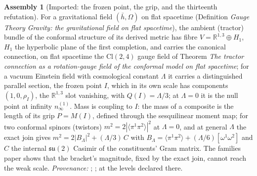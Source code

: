 \documentclass[11pt]{article}
\theoremstyle{definition}
\newtheorem{assembled}[theorem]{Assembly}
\theoremstyle{plain}
\newcommand{\changedmark}[2]{\marginpar{\raggedright\scriptsize\color{#1}#2}}
\providecommand{\Cl}{}\renewcommand{\Cl}{\mathrm{Cl}}
\providecommand{\R}{}\renewcommand{\R}{\mathbb{R}}
\providecommand{\hb}{}\renewcommand{\hb}{\bar{h}}
\providecommand{\nInf}{}\renewcommand{\nInf}{n_\infty}
\providecommand{\br}{}\renewcommand{\br}[1]{\langle #1\rangle}
\begin{document}
\begin{assembled}[Imported: the frozen point, the grip, and the thirteenth refutation]\label{c:standard-model.imported-frozen-point-grip-thirteenth-refutation}
\changedmark{gray}{reworded}
For a gravitational field $(\hb, \Omega)$ on flat spacetime (Definition \emph{Gauge Theory Gravity: the gravitational field on flat spacetime}), the ambient (tractor) bundle of the conformal structure of its derived metric has fibre $V = \R^{1,3} \oplus H_{1}$, $H_{1}$ the hyperbolic plane of the first completion, and carries the canonical connection, on flat spacetime the $\Cl(2,4)$ gauge field of Theorem \emph{The tractor connection as a rotation-gauge field of the conformal model on flat spacetime}; for a vacuum Einstein field with cosmological constant $\Lambda$ it carries a distinguished parallel section, the frozen point $I$, which in its own scale has components $(1, 0, \rho_{I})$, the $\R^{1,3}$ slot vanishing, with $Q(I) = \Lambda/3$; at $\Lambda = 0$ it is the null point at infinity $\nInf^{(1)}$. Mass is coupling to $I$: the mass of a composite is the length of its grip $P = M(I)$, defined through the sesquilinear moment map; for two conformal spinors (twistors) $m^{2} = 2|\br{\pi^{1}\pi^{2}}|^{2}$ at $\Lambda = 0$, and at general $\Lambda$ the exact join gives $m^{2} = 2|B_{\Lambda}|^{2} + (\Lambda/3)\,C$ with $B_{\Lambda} = \br{\pi^{1}\pi^{2}} + (\Lambda/6)[\omega^{1}\omega^{2}]$ and $C$ the internal $\mathfrak{su}(2)$ Casimir of the constituents' Gram matrix. The families paper shows that the bracket's magnitude, fixed by the exact join, cannot reach the weak scale. \emph{Provenance:} \cite[Fact~2.1, Def.~5.4, Prop.~4.1, Thm.~5.6]{ButlerT11}; \cite[Prop.~4.3]{ButlerT13}; at the levels declared there.
\end{assembled}
\end{document}
